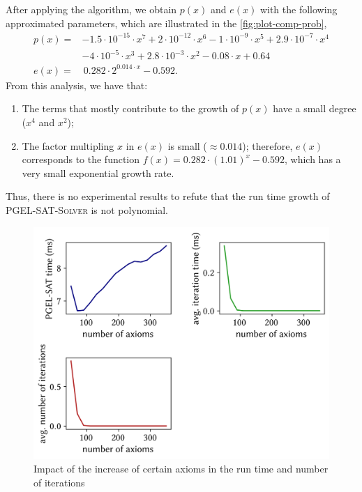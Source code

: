 After applying the algorithm, we obtain $p(x)$ and $e(x)$ with the following approximated parameters, which are illustrated in the \cref{fig:plot-comp-prob},
\begin{align*}
  p(x) =& -1.5  \cdot  10^{-15} \cdot x^7 
        + 2 \cdot 10^{-12} \cdot x^6 
        - 1 \cdot 10^{-9} \cdot x^5 
        + 2.9 \cdot 10^{-7} \cdot x^4\\ 
        &- 4 \cdot 10^{-5} \cdot x^3 
        + 2.8  \cdot  10^{-3}\cdot x^2 
        - 0.08 \cdot x 
        + 0.64\\
  e(x) =& \, 0.282 \cdot 2^{0.014 \cdot x} - 0.592.
\end{align*}
From this analysis, we have that:
\begin{enumerate}[label=(\alph*)]
  \item The terms that mostly contribute to the growth of $p(x)$ have a small degree ($x^4$ and $x^2$);
  \item The factor multipling $x$ in $e(x)$ is small ($\approx 0.014$); therefore, $e(x)$ corresponds to the function $f(x) = 0.282 \cdot (1.01)^{x} - 0.592$, which has a very small exponential growth rate.
\end{enumerate}
Thus, there is no experimental results to refute that the run time growth of \textsc{PGEL-SAT-Solver} is not polynomial. 

\begin{figure}[ht]
  \centering
  \includegraphics[width=.75\textwidth]{../img/plot-comp1-0}
  \caption{Impact of the increase of certain axioms in the run time and number of iterations}
  \label{fig:plot-comp-1}
\end{figure}

